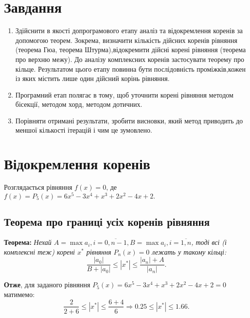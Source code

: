 \documentclass[a4paper,14pt]{extarticle} %
\begin{document}


\newpage
\tableofcontents

\newpage

\section*{Завдання}
\begin{enumerate} 

    \item Здійснити в якості допрограмового етапу аналіз 
    та відокремлення коренів за допомогою теорем. Зокрема, 
    визначити кількість дійсних коренів рівняння (теорема 
    Гюа, теорема Штурма),відокремити дійсні корені рівняння 
    (теорема про верхню межу). До аналізу комплексних коренів
    застосувати теорему про кільце. Результатом цього етапу 
    повинна бути послідовність проміжків,кожен із яких 
    містить лише один дійсний корінь рівняння.

    \item Програмний етап полягає в тому, щоб уточнити корені 
    рівняння методом бісекції, методом хорд, методом дотичних.

    \item Порівняти отримані результати, зробити висновки, 
    який метод приводить до меншої кількості ітерацій і чим це зумовлено.

\end{enumerate}

\section{Відокремлення коренів}

Розглядається рівняння $f(x)=0$, де 
$f(x)=P_5(x)=6x^5-3x^4+x^3+2x^2-4x+2.$
\subsection{Теорема про границі усіх коренів рівняння}

\textbf{Теорема:} \textit{Нехай $A=\max{a_i}, i=\overline{0,n-1}, 
B=\max{a_i}, i=\overline{1,n}$, тоді всі (і комплексні теж) корені $x^{*}$
рівняння $P_n(x)=0$ лежать у такому кільці: 
\[ \dfrac{|a_0|}{B+|a_0|} \leqslant |x^{*}| \leqslant \dfrac{|a_n|+A}{|a_n|}. \]}

\textbf{Отже}, для заданого рівняння $P_5(x)=6x^5-3x^4+x^3+2x^2-4x+2=0$ матимемо: 
\[ \dfrac{2}{2+6} \leqslant |x^{*}| \leqslant \dfrac{6+4}{6} 
\Rightarrow 0.25 \leqslant |x^{*}| \leqslant 1.66. \]
\end{document}
